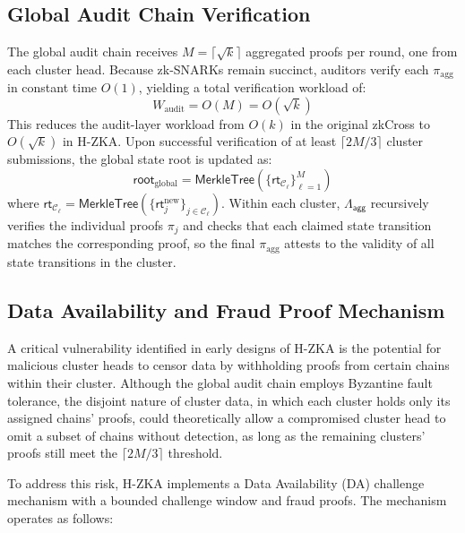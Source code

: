 \documentclass[journal]{IEEEtran}
\newcommand{\aggCircuit}{\Lambda_{\mathsf{agg}}}
\newcommand{\rootNew}{\mathsf{rt}_{j}^{\text{new}}}
\begin{document}
\subsection{Global Audit Chain Verification}

The global audit chain receives $M = \lceil \sqrt{k} \rceil$ aggregated proofs per round, one from each cluster head. Because zk-SNARKs remain succinct, auditors verify each $\pi_{\text{agg}}$ in constant time $O(1)$, yielding a total verification workload of:
\begin{equation}
W_{\text{audit}} = O(M) = O(\sqrt{k})
\label{eq:audit_workload}
\end{equation}
This reduces the audit-layer workload from $O(k)$ in the original zkCross to $O(\sqrt{k})$ in H-ZKA. Upon successful verification of at least $\lceil 2M/3 \rceil$ cluster submissions, the global state root is updated as:
\begin{equation}
\mathsf{root}_{\text{global}} = \mathsf{MerkleTree}\left(\{\mathsf{rt}_{\mathcal{C}_\ell}\}_{\ell=1}^{M}\right)
\label{eq:global_root}
\end{equation}
where $\mathsf{rt}_{\mathcal{C}_\ell} = \mathsf{MerkleTree}(\{\rootNew\}_{j \in \mathcal{C}_\ell})$. Within each cluster, $\aggCircuit$ recursively verifies the individual proofs $\pi_j$ and checks that each claimed state transition matches the corresponding proof, so the final $\pi_{\text{agg}}$ attests to the validity of all state transitions in the cluster.

\subsection{Data Availability and Fraud Proof Mechanism}

A critical vulnerability identified in early designs of H-ZKA is the potential for malicious cluster heads to censor data by withholding proofs from certain chains within their cluster. Although the global audit chain employs Byzantine fault tolerance, the disjoint nature of cluster data, in which each cluster holds only its assigned chains' proofs, could theoretically allow a compromised cluster head to omit a subset of chains without detection, as long as the remaining clusters' proofs still meet the $\lceil 2M/3 \rceil$ threshold.

To address this risk, H-ZKA implements a Data Availability (DA) challenge mechanism with a bounded challenge window and fraud proofs. The mechanism operates as follows:
\end{document}
